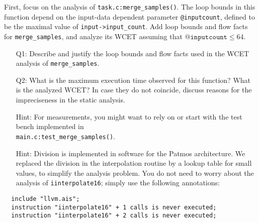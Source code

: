 \label{problem:3}

First, focus on the analysis of \texttt{task.c:merge\_samples()}.  The loop
bounds in this function depend on the input-data dependent parameter
\texttt{@inputcount}, defined to be the maximal value of
\texttt{input->input\_count}. Add loop bounds and flow facts for
\texttt{merge\_samples}, and analyze its WCET assuming that
$\texttt{@inputcount} \leq 64$.

\begin{itemize}

\item[Q1:]
  Describe and justify the loop bounds and flow facts used in the WCET analysis
  of \texttt{merge\_samples}.

\item[Q2:]
  What is the maximum execution time observed for this function? What is the
  analyzed WCET? In case they do not coincide, discuss reasons for the
  impreciseness in the static analysis.

\item[Hint:]
  For measurements, you might want to rely on or start with the test bench
  implemented in\\
  \texttt{main.c:test\_merge\_samples()}.

\item[Hint:]
  Division is implemented in software for the Patmos architecture. We replaced
  the division in the interpolation routine by a lookup table for small values,
  to simplify the analysis problem. You do not need to worry about the analysis
  of \texttt{iinterpolate16}; simply use the following annotations:

\end{itemize}

\begin{verbatim}
  include "llvm.ais";
  instruction "iinterpolate16" + 1 calls is never executed;
  instruction "iinterpolate16" + 2 calls is never executed;
\end{verbatim}
